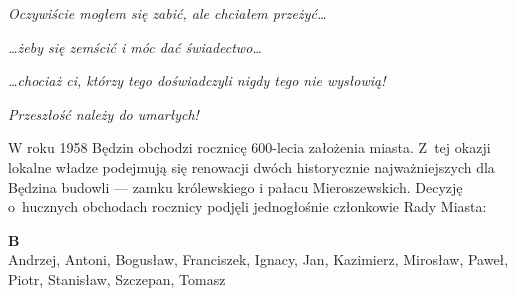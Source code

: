 \documentclass[11pt,a4paper,oneside]{article}
\begin{document}
\emph{Oczywiście mogłem się zabić, ale chciałem przeżyć\dots{}} 

\emph{\dots{}żeby się zemścić i móc dać świadectwo\dots{}}

\emph{\dots{}chociaż ci, którzy tego doświadczyli nigdy tego nie wysłowią!}

\emph{Przeszłość należy do umarłych!}

W roku 1958 Będzin obchodzi rocznicę 600-lecia założenia miasta.
Z~tej okazji lokalne władze podejmują się renowacji dwóch historycznie
najważniejszych dla Będzina budowli --- zamku królewskiego i pałacu
Mieroszewskich. Decyzję o~hucznych obchodach rocznicy podjęli
jednogłośnie członkowie Rady Miasta:

\textbf{B}\\
Andrzej, Antoni, Bogusław, Franciszek, Ignacy, Jan, Kazimierz, Mirosław, 
Paweł, Piotr, Stanisław, Szczepan, Tomasz
\end{document}
